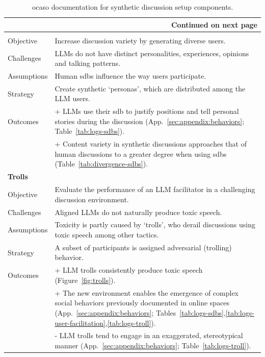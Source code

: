 \begin{longtable}{p{3cm} p{9cm}}
	\caption{\ac{ocaso} documentation for synthetic discussion setup components.}
	\label{tab:ocaso_full_setup} \\
	
	\toprule
	\endfirsthead
	
	\toprule
	\endhead
	
	\midrule
	\multicolumn{2}{r}{Continued on next page} \\
	\midrule
	\endfoot
	
	\bottomrule
	\endlastfoot
	
	\multicolumn{2}{l}{\textbf{Personas}} \\
	\midrule
	Objective & Increase discussion variety by generating diverse users. \\
	Challenges & LLMs do not have distinct personalities, experiences, opinions and talking patterns. \\
	Assumptions & Human \acp{sdb} influence the way users participate. \\
	Strategy & Create synthetic `personas', which are distributed among the LLM users. \\
	Outcomes & + LLMs use their \ac{sdb} to justify positions and tell personal stories during the discussion (App.~\ref{sec:appendix:behaviors}; Table~\ref{tab:logs-sdbs}). \\
	& + Content variety in synthetic discussions approaches that of human discussions to a greater degree when using \acp{sdb} (Table~\ref{tab:divergence-sdbs}). \\
	
	\midrule
	
	\multicolumn{2}{l}{\textbf{Trolls}} \\
	\midrule
	Objective & Evaluate the performance of an LLM facilitator in a challenging discussion environment. \\
	Challenges & Aligned LLMs do not naturally produce toxic speech. \\
	Assumptions & Toxicity is partly caused by `trolls', who derail discussions using toxic speech among other tactics. \\
	Strategy & A subset of participants is assigned adversarial (trolling) behavior. \\
	Outcomes & + LLM trolls consistently produce toxic speech (Figure~\ref{fig:trolls}). \\
	& + The new environment enables the emergence of complex social behaviors previously documented in online spaces (App.~\ref{sec:appendix:behaviors}; Tables~\ref{tab:logs-sdbs},\ref{tab:logs-user-facilitation},\ref{tab:logs-troll}). \\
	& - LLM trolls tend to engage in an exaggerated, stereotypical manner (App.~\ref{sec:appendix:behaviors}; Table~\ref{tab:logs-troll}). \\
	

\end{longtable}
